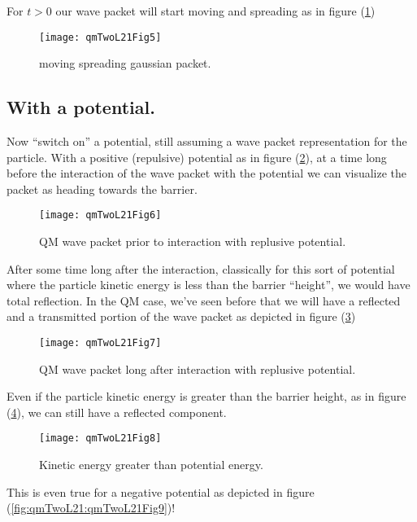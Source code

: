 For $t > 0$ our wave packet will start moving and spreading as in figure (\ref{fig:qmTwoL21:qmTwoL21Fig5})
\begin{figure}[htp]
   \centering
   \texttt{[image: qmTwoL21Fig5]}
   \caption{moving spreading gaussian packet.}\label{fig:qmTwoL21:qmTwoL21Fig5}
\end{figure}

\subsection{With a potential.}

Now ``switch on'' a potential, still assuming a wave packet representation for the particle.  With a positive (repulsive) potential as in figure (\ref{fig:qmTwoL21:qmTwoL21Fig6}), at a time long before the interaction of the wave packet with the potential we can visualize the packet as heading towards the barrier.

\begin{figure}[htp]
   \centering
   \texttt{[image: qmTwoL21Fig6]}
   \caption{QM wave packet prior to interaction with replusive potential.}\label{fig:qmTwoL21:qmTwoL21Fig6}
\end{figure}

After some time long after the interaction, classically for this sort of potential where the particle kinetic energy is less than the barrier ``height'', we would have total reflection.  In the QM case, we've seen before that we will have a reflected and a transmitted portion of the wave packet as depicted in figure (\ref{fig:qmTwoL21:qmTwoL21Fig7})
\begin{figure}[htp]
   \centering
   \texttt{[image: qmTwoL21Fig7]}
   \caption{QM wave packet long after interaction with replusive potential.}\label{fig:qmTwoL21:qmTwoL21Fig7}
\end{figure}

Even if the particle kinetic energy is greater than the barrier height, as in figure (\ref{fig:qmTwoL21:qmTwoL21Fig8}), we can still have a reflected component.
\begin{figure}[htp]
   \centering
   \texttt{[image: qmTwoL21Fig8]}
   \caption{Kinetic energy greater than potential energy.}\label{fig:qmTwoL21:qmTwoL21Fig8}
\end{figure}

This is even true for a negative potential as depicted in figure (\ref{fig:qmTwoL21:qmTwoL21Fig9})!


